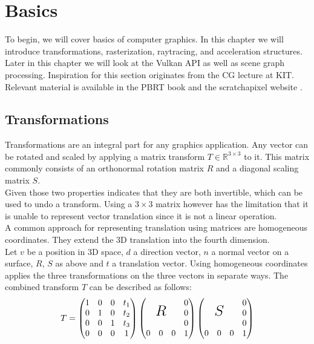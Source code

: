 \chapter{Basics}
To begin, we will cover basics of computer graphics. In this chapter we will introduce transformations, rasterization, raytracing, and acceleration structures. Later in this chapter we will look at the Vulkan API as well as scene graph processing. Inspiration for this section originates from the CG lecture at KIT. Relevant material is available in the PBRT book \cite{pbrBook} and the scratchapixel website \cite{scrathAPixel}.
\section{Transformations}
\label{sec:transformations}
Transformations are an integral part for any graphics application. Any vector can be rotated and scaled by applying a matrix transform ${T} \in \mathbb{R}^{3\times3}$ to it. This matrix commonly consists of an orthonormal rotation matrix ${R}$ and a diagonal scaling matrix ${S}$.\\
Given those two properties indicates that they are both invertible, which can be used to undo a transform. Using a ${3\times3}$ matrix however has the limitation that it is unable to represent vector translation since it is not a linear operation.\\
A common approach for representing translation using matrices are homogeneous coordinates. They extend the 3D translation into the fourth dimension.\\
Let $v$ be a position in 3D space, $d$ a direction vector, $n$ a normal vector on a surface, ${R}$, ${S}$ as above and $t$ a translation vector. Using homogeneous coordinates applies the three transformations on the three vectors in separate ways. The combined transform ${T}$ can be described as follows:\\
\[
{T} = 
\begin{pmatrix}
1 & 0 & 0 & t_1 \\
0 & 1 & 0 & t_2 \\
0 & 0 & 1 & t_3 \\
0 & 0 & 0 & 1
\end{pmatrix}
\begin{pmatrix}
 \mbox{\LARGE ${R}$} & \begin{matrix} 0 \\ 0 \\ 0\end{matrix} \\
 \begin{matrix} 0 & 0 & 0\end{matrix} & 1
\end{pmatrix}
\begin{pmatrix}
 \mbox{\LARGE ${S}$} & \begin{matrix} 0 \\ 0 \\ 0\end{matrix} \\
 \begin{matrix} 0 & 0 & 0\end{matrix} & 1
\end{pmatrix}
\]
